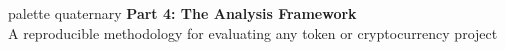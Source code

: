 \documentclass[8pt,aspectratio=169]{beamer}
\begin{document}
\begin{frame}{}
\vfill
\begin{beamercolorbox}[sep=12pt,center,rounded=true,shadow=true]{palette quaternary}
{\Large\bfseries Part 4: The Analysis Framework}\\[6pt]
{\normalsize A reproducible methodology for evaluating any token or cryptocurrency project}
\end{beamercolorbox}
\vfill
\end{frame}

\end{document}
